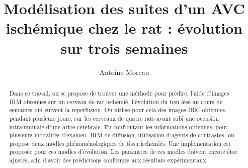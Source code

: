 \documentclass[a4paper,10pt]{article}
\title{Mod\'elisation des suites d'un AVC isch\'emique chez le rat : \'evolution sur trois semaines}
\author{Antoine Moreau}
\begin{document}
\maketitle

\begin{abstract}
Dans ce travail, on se propose de trouver une m\'ethode pour pr\'edire, %
 l'aide d'images IRM obtenues sur un cerveau de rat isch\'emi\'e, %
l'\'evolution du tisu l\'es\'e au cours de semaines qui suivent la reperfusion. %
%
On utilise pour cela des images IRM obtenues, pendant plusieurs jours, %
sur les cerveaux de quatre rats ayant subi une occusion intraluminale d'une artre c\'er\'ebrale. %
%
En confrontant les informations obtenues, pour plusieurs modalit\'es d'examen %
-IRM de diffusion, utilisation d'agents de contrastes- %
on propose deux modles ph\'enom\'enologiques de tissu isch\'emi\'es. %
%
Une impl\'ementation est propos\'ee pour ces modles d'\'evolution. %
%
Les paramtres de ces modles doivent encore \^etre ajust\'es, %
afin d'avoir des pr\'edictions conformes aux r\'esultats exp\'erimentaux.
\end{abstract}








%


\newpage


\end{document}
